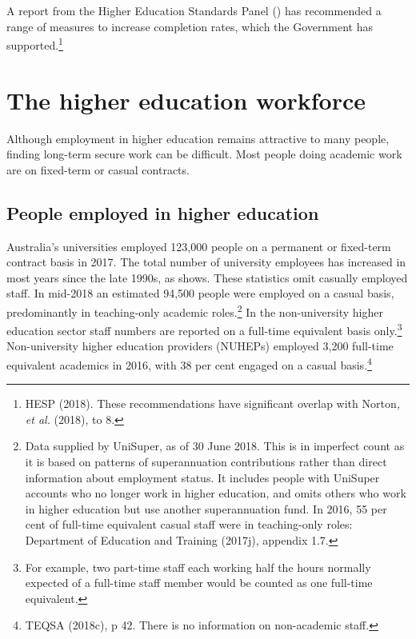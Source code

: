 \documentclass{grattan}
\begin{document}
A report from the Higher Education Standards Panel () has recommended a range of measures to increase completion rates, which the Government has supported.\footnote{HESP (2018). These recommendations have significant overlap with Norton\emph{, et al.} (2018),  to 8.}

%


%
\chapter{The higher education workforce}\label{chap:the-higher-education-workforce}

%


Although employment in higher education remains attractive to many people, finding long-term secure work can be difficult. Most people doing academic work are on fixed-term or casual contracts.

%
\section{People employed in higher education }\label{sec:people-employed-in-higher-education}

Australia's universities employed 123,000 people on a permanent or fixed-term contract basis in 2017. The total number of university employees has increased in most years since the late 1990s, as  shows. These statistics omit casually employed staff. In mid-2018 an estimated 94,500 people were employed on a casual basis, predominantly in teaching-only academic roles.\footnote{Data supplied by UniSuper, as of 30 June 2018. This is in imperfect count as it is based on patterns of superannuation contributions rather than direct information about employment status. It includes people with UniSuper accounts who no longer work in higher education, and omits others who work in higher education but use another superannuation fund. In 2016, 55 per cent of full-time equivalent casual staff were in teaching-only roles: Department of Education and Training (2017j), appendix 1.7.} In the non-university higher education sector staff numbers are reported on a full-time equivalent basis only.\footnote{For example, two part-time staff each working half the hours normally expected of a full-time staff member would be counted as one full-time equivalent.} Non-university higher education providers (NUHEPs) employed 3,200 full-time equivalent academics in 2016, with 38 per cent engaged on a casual basis.\footnote{TEQSA (2018c), p 42. There is no information on non-academic staff.}
\end{document}
